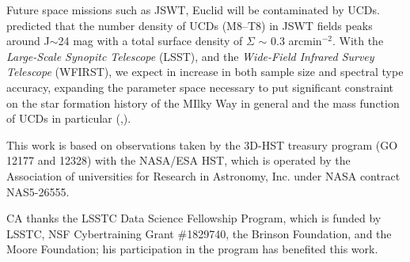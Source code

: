 \documentclass[manuscript]{aastex63}
\begin{document}
Future space missions such as JSWT, Euclid will be contaminated by UCDs. \cite{RyanJr.2016} predicted that the number density of UCDs (M8--T8) in JSWT fields peaks around J$\sim$24 mag with a total surface density of $\Sigma$ $\sim$ 0.3 arcmin$^{-2}$.  With the \textit{Large-Scale Synopitc Telescope} (LSST), and the \textit{Wide-Field Infrared Survey Telescope} (WFIRST), we expect in increase in both sample size and spectral type accuracy, expanding the parameter space necessary to put significant constraint on the star formation history of the MIlky Way in general and the mass function of UCDs in particular (\citealt{LSSTScienceCollaboration2009},\citealt{Spergel2015}).


\acknowledgements
This work is based on observations taken by the 3D-HST treasury program (GO 12177 and 12328) with the NASA/ESA HST, which is operated by the Association of universities for Research in Astronomy, Inc. under NASA contract NAS5-26555.

CA thanks the LSSTC Data Science Fellowship Program, which is funded by LSSTC, NSF Cybertraining Grant \#1829740, the Brinson Foundation, and the Moore Foundation; his participation in the program has benefited this work.


\clearpage




\end{document}
